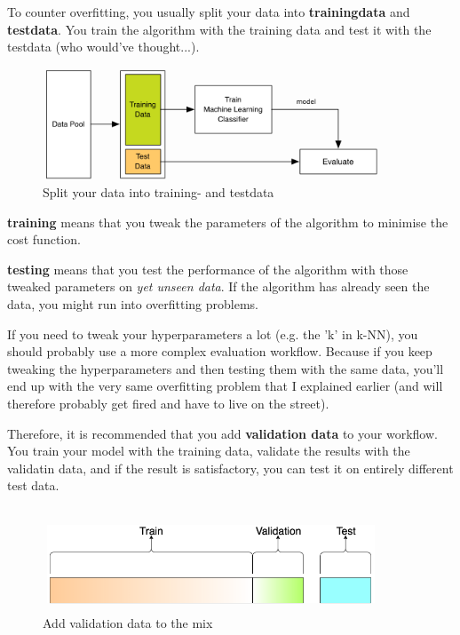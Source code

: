 \documentclass[11pt]{article}
\begin{document}
To counter overfitting, you usually split your data into \textbf{trainingdata} and \textbf{testdata}. You train the algorithm with the training data and test it with the testdata (who would've thought...).

\begin{figure}[htb!]
    \centering
    \includegraphics[keepaspectratio=true,width=0.9\textwidth]{training_testdata.png}
    \caption{Split your data into training- and testdata}
    \label{fig:training_testdata}
\end{figure}

\textbf{training} means that you tweak the parameters of the algorithm to minimise the cost function.

\textbf{testing} means that you test the performance of the algorithm with those tweaked parameters on \textit{yet unseen data}. If the algorithm has already seen the data, you might run into overfitting problems.

\vspace{10px}

If you need to tweak your hyperparameters a lot (e.g. the 'k' in k-NN), you should probably use a more complex evaluation workflow. Because if you keep tweaking the hyperparameters and then testing them with the same data, you'll end up with the very same overfitting problem that I explained earlier (and will therefore probably get fired and have to live on the street).

\vspace{10px}

Therefore, it is recommended that you add \textbf{validation data} to your workflow. You train your model with the training data, validate the results with the validatin data, and if the result is satisfactory, you can test it on entirely different test data.

\begin{figure}[htb!]
    \centering
    \includegraphics[keepaspectratio=true,width=0.9\textwidth]{validation_data.png}
    \caption{Add validation data to the mix}
    \label{fig:validation_data}
\end{figure}
\end{document}
